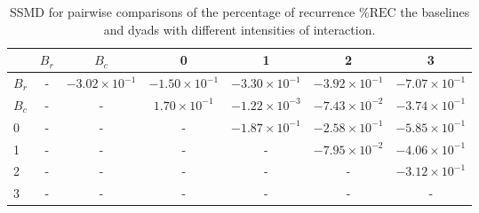 \begin{table}
\centering
\caption{SSMD for pairwise comparisons of the percentage of recurrence $\%\text{REC}$ the baselines and dyads with different intensities of interaction.}
\label{tab:ssmd_rec}
\begin{tabular}{lcccccc}
\toprule
 & $B_r$ & $B_c$ & 0 & 1 & 2 & 3 \\
\midrule
$B_r$ & - & $-3.02 \times 10^{-1}$ & $-1.50 \times 10^{-1}$ & $-3.30 \times 10^{-1}$ & $-3.92 \times 10^{-1}$ & $-7.07 \times 10^{-1}$ \\
$B_c$ & - & - & $1.70 \times 10^{-1}$ & $-1.22 \times 10^{-3}$ & $-7.43 \times 10^{-2}$ & $-3.74 \times 10^{-1}$ \\
0 & - & - & - & $-1.87 \times 10^{-1}$ & $-2.58 \times 10^{-1}$ & $-5.85 \times 10^{-1}$ \\
1 & - & - & - & - & $-7.95 \times 10^{-2}$ & $-4.06 \times 10^{-1}$ \\
2 & - & - & - & - & - & $-3.12 \times 10^{-1}$ \\
3 & - & - & - & - & - & - \\
\bottomrule
\end{tabular}
\end{table}
